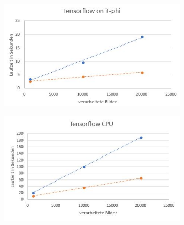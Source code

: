 \documentclass[../main.tex]{subfiles}
\begin{document}
\begin{figure}
	\begin{subfigure}{0.49\textwidth}
		\centering
		\includegraphics[width=\linewidth]{../images/Schmidt/bm_tf_phi.jpg}
	\end{subfigure}%
	\begin{subfigure}{0.49\textwidth}
		\centering
		\includegraphics[width=\linewidth]{../images/Schmidt/bm_tf_std.jpg}
	\end{subfigure}


\end{figure}
\end{document}
